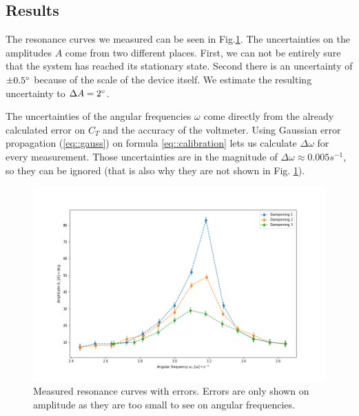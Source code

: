 \subsection{Results}
The resonance curves we measured can be seen in Fig.\ref{fig::resonance}.
The uncertainties on the amplitudes $A$ come from two different places.
First, we can not be entirely sure that the system has reached its stationary state.
Second there is an uncertainty of $\pm 0.5 \degree$ because of the scale of the device itself.
We estimate the resulting uncertainty to $\Delta A = 2 \degree$.

The uncertainties of the angular frequencies $\omega$ come directly from the already calculated error on $C_T$ and the accuracy of the voltmeter.
Using Gaussian error propagation (\ref{eq::gauss}) on formula \ref{eq::calibration} lets us calculate $\Delta \omega$ for every measurement. 
Those uncertainties are in the magnitude of $\Delta \omega \approx 0.005 s^{-1}$, so they can be ignored (that is also why they are not shown in Fig. \ref{fig::resonance}).

\begin{figure} [ht]
	\centering
	\includegraphics[width=350pt]{python/resonance.PNG}
	\caption{Measured resonance curves with errors. Errors are only shown on amplitude as they are too small to see on angular frequencies.}
	\label{fig::resonance}
\end{figure}
